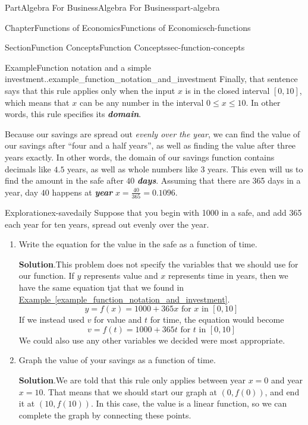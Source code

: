 \documentclass[oneside,10pt,]{tufte-book}
\newcommand{\blocktitlefont}{\relax}
\newcommand{\xreffont}{\relax}
\newcommand{\alert}[1]{\textbf{\textit{#1}}}
\numberwithin{equation}{chapter}
\begin{document}
\begin{partptx}{Part}{Algebra For Business}{}{Algebra For Business}{}{}{part-algebra}
\begin{chapterptx}{Chapter}{Functions of Economics}{}{Functions of Economics}{}{}{ch-functions}
\begin{sectionptx}{Section}{Function Concepts}{}{Function Concepts}{}{}{sec-function-concepts}
\begin{example}{Example}{Function notation and a simple investment..}{example_function_notation_and_investment}
Finally, that sentence says that this rule applies only when the input \(x\) is in the closed interval \([0,10]\), which means that \(x\) can be any number in the interval \(0\leq x\leq 10\). In other words, this rule specifies its \alert{domain}.%
\par
Because our savings are spread out \emph{evenly over the year}, we can find the value of our savings after ``four and a half years'', as well as finding the value after three years exactly. In other words, the domain of our savings function contains decimals like \(4.5\) years, as well as whole numbers like \(3\) years. This even will us to find the amount in the safe after \(40\) \alert{days}.  Assuming that there are 365 days in a year, day \(40\) happens at \alert{year} \(x=\frac{40}{365}=0.1096\).%
\end{example}
\begin{exploration}{Exploration}{}{ex-savedaily}%
Suppose that you  begin with \textdollar{}1000 in a safe, and add \textdollar{}365 each year for ten years, spread out evenly over the year.%
\begin{enumerate}[font=\bfseries,label=(\alph*),ref=\alph*]%
\item{}Write the equation for the value in the safe as a function of time.%
\par\smallskip%
\noindent\textbf{\blocktitlefont Solution}.\hypertarget{ex-savedaily-2-2}{}\quad{}This problem does not specify the variables that we should use for our function.  If \(y\) represents value and \(x\) represents time in years, then we have the same equation tjat that we found in \hyperref[example_function_notation_and_investment]{Example~{\xreffont\ref{example_function_notation_and_investment}}}.%
\begin{equation*}
y = f(x) = 1000 + 365 x \text{ for }x\text{ in } [0,10]
\end{equation*}
If we instead used \(v\) for value and \(t\) for time, the equation would become%
\begin{equation*}
v = f(t) = 1000 + 365 t \text{ for }t\text{ in } [0,10]
\end{equation*}
We could also use any other variables we decided were most appropriate.%
\item{}Graph the value of your savings as a function of time.%
\par\smallskip%
\noindent\textbf{\blocktitlefont Solution}.\hypertarget{ex-savedaily-3-2}{}\quad{}We are told that this rule only applies between year \(x=0\) and year \(x=10\). That means that we should start our graph at \((0,f(0))\), and end it at \((10,f(10))\). In this case, the value is a linear function, so we can complete the graph by connecting these points.%

\end{enumerate}
\end{exploration}
\end{sectionptx}
\end{chapterptx}
\end{partptx}
\end{document}
